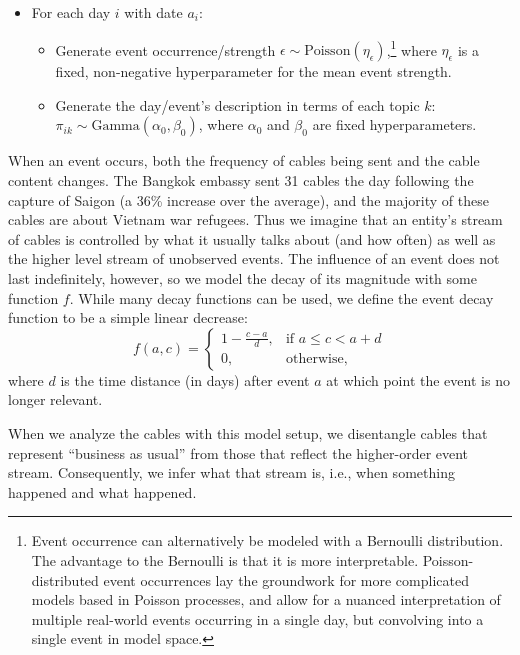 \begin{itemize}
\item For each day $i$ with date $a_i$:
\begin{itemize}
\item Generate event occurrence/strength $\epsilon \sim \mbox{Poisson}
(\eta_\epsilon)$,\footnote{Event occurrence can alternatively be modeled with a Bernoulli distribution.  The advantage to the Bernoulli is that it is more interpretable.  Poisson-distributed event occurrences lay the groundwork for more complicated models based in Poisson processes, and allow for a nuanced interpretation of multiple real-world events occurring in a single day, but convolving into a single event in model space.} where $\eta_\epsilon$ is a fixed, non-negative
hyperparameter for the mean event strength.
\item Generate the day/event's description in terms of each topic $k$: $\pi_{ik} \sim \mbox{Gamma}(\alpha_0, \beta_0)$, where $\alpha_0$ and $\beta_0$ are fixed hyperparameters.
\end{itemize}
\end{itemize}

When an event occurs, both the frequency of cables being sent and the cable content changes. The Bangkok embassy sent 31 cables the day following the capture of Saigon (a 36\% increase over the average), and the majority of these cables are about Vietnam war refugees.  Thus we imagine that an entity's stream of cables is controlled by what it usually talks about (and how often) as well as the higher level stream of unobserved events.  The influence of an event does not last indefinitely, however, so we model the decay of its magnitude with some function $f$.
While many decay functions can be used, we define the event decay function to be a simple linear decrease: \[f(a, c) =
\begin{cases}
	1 - \frac{c-a}{d}, & \mbox{if } a \le c < a+d \\
	0, & \mbox{otherwise,}
\end{cases} \]
where $d$ is the time distance (in days) after event $a$ at which point the event is no longer relevant.

When we analyze the cables with this model setup, we disentangle cables that represent ``business as usual'' from those that reflect the higher-order event stream.  Consequently, we infer what that stream is,
i.e., when something happened and what happened.

